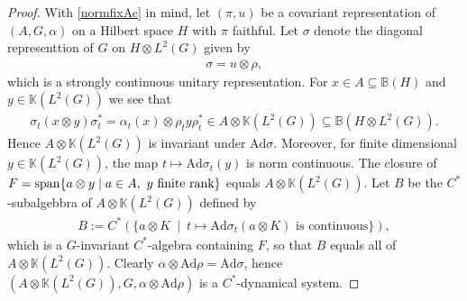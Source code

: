 \begin{proof}
	With \cref{normfixAc} in mind, let $(\pi,u)$ be a covariant representation of $(A, G, \alpha)$ on a Hilbert space $H$ with $\pi$ faithful. Let $\sigma$ denote the diagonal representtion of $G$ on $H \otimes L^2(G)$ given by
\begin{align*}
\sigma = u \otimes \rho,
\end{align*}
which is a strongly continuous unitary representation. For $x \in A \subseteq \mathbb{B}(H)$ and $y \in \mathbb{K}(L^2(G))$ we see that
\begin{align*}
	\sigma_t (x \otimes y) \sigma_t^* = \alpha_t(x) \otimes \rho_t y \rho_t^* \in A \otimes \mathbb{K}(L^2(G)) \subseteq \mathbb{B}(H \otimes L^2(G)).
\end{align*}
Hence $A \otimes \mathbb{K}(L^2(G))$ is invariant under $\mathrm{Ad} \sigma$. Moreover, for finite dimensional $y \in \mathbb{K}(L^2(G))$, the map $t \mapsto \mathrm{Ad} {\sigma_t}(y)$ is norm continuous. The closure of $F = \mathrm{span}\{a \otimes y \mid a \in A, \ y \text{ finite rank}\}$ equals $A \otimes \mathbb{K}(L^2(G))$. Let $B$ be the $C^*$-subalgebbra of $A \otimes \mathbb{K}(L^2(G))$ defined by
\begin{align*}
	B :=C^*( \{ a \otimes K \ \mid \ t \mapsto \mathrm{Ad} \sigma_t (a \otimes K) \text{ is continuous} \}),
\end{align*}
which is a $G$-invariant $C^*$-algebra containing $F$, so that $B$ equals all of $A \otimes \mathbb{K}(L^2(G))$. Clearly $\alpha \otimes \mathrm{Ad} \rho = \mathrm{Ad} {\sigma}$, hence $(A \otimes \mathbb{K}(L^2(G)), G , \alpha \otimes \mathrm{Ad} \rho)$ is a $C^*$-dynamical system.
\end{proof}

